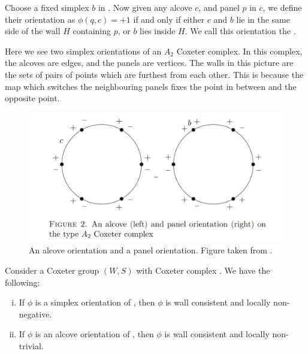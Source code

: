 \documentclass[11pt]{article}
\begin{document}
\begin{definition}
    Choose a fixed simplex $b$ in \sg. Now given any alcove $c$, and panel $p$ in $c$, we define their orientation as $\phi(q,c)=+1$ if and only if either $c$ and $b$ lie in the same side of the wall $H$ containing $p$, or $b$ lies inside $H$. We call this orientation the .
\end{definition}
\begin{example}
    Here we see two simplex orientations of an $A_2$ Coxeter complex. In this complex, the alcoves are edges, and the panels are vertices. The walls in this picture are the sets of pairs of points which are furthest from each other. This is because the map which switches the neighbouring panels fixes the point in between and the opposite point. 
\end{example}
\begin{figure}[!htbp]
    \begin{center}
    \includegraphics[scale=0.5]{Screenshot 2023-02-03 102201.png}
    \end{center}
    \caption{An alcove orientation and a panel orientation. Figure taken from \cite[p.124]{SHA}.}
\end{figure}
\begin{lemma}
    Consider a Coxeter group $(W,S)$ with Coxeter complex \sg. We have the following:
    \begin{enumerate}[(i)]
        \item If $\phi$ is a simplex orientation of \sg, then $\phi$ is wall consistent and locally non-negative.
        \item If $\phi$ is an alcove orientation of \sg, then $\phi$ is wall consistent and locally non-trivial.
    \end{enumerate}
\end{lemma}
\end{document}
